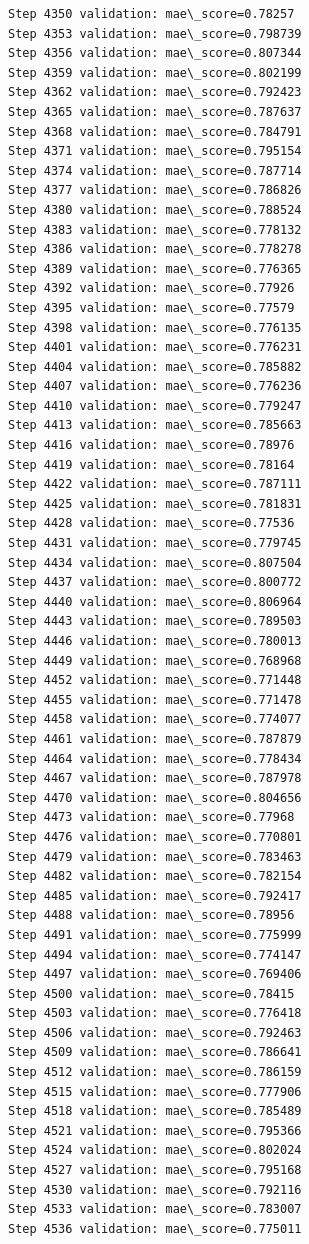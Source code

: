 \documentclass[11pt]{article}
\begin{document}
\begin{Verbatim}[commandchars=\\\{\}]
Step 4350 validation: mae\_score=0.78257
Step 4353 validation: mae\_score=0.798739
Step 4356 validation: mae\_score=0.807344
Step 4359 validation: mae\_score=0.802199
Step 4362 validation: mae\_score=0.792423
Step 4365 validation: mae\_score=0.787637
Step 4368 validation: mae\_score=0.784791
Step 4371 validation: mae\_score=0.795154
Step 4374 validation: mae\_score=0.787714
Step 4377 validation: mae\_score=0.786826
Step 4380 validation: mae\_score=0.788524
Step 4383 validation: mae\_score=0.778132
Step 4386 validation: mae\_score=0.778278
Step 4389 validation: mae\_score=0.776365
Step 4392 validation: mae\_score=0.77926
Step 4395 validation: mae\_score=0.77579
Step 4398 validation: mae\_score=0.776135
Step 4401 validation: mae\_score=0.776231
Step 4404 validation: mae\_score=0.785882
Step 4407 validation: mae\_score=0.776236
Step 4410 validation: mae\_score=0.779247
Step 4413 validation: mae\_score=0.785663
Step 4416 validation: mae\_score=0.78976
Step 4419 validation: mae\_score=0.78164
Step 4422 validation: mae\_score=0.787111
Step 4425 validation: mae\_score=0.781831
Step 4428 validation: mae\_score=0.77536
Step 4431 validation: mae\_score=0.779745
Step 4434 validation: mae\_score=0.807504
Step 4437 validation: mae\_score=0.800772
Step 4440 validation: mae\_score=0.806964
Step 4443 validation: mae\_score=0.789503
Step 4446 validation: mae\_score=0.780013
Step 4449 validation: mae\_score=0.768968
Step 4452 validation: mae\_score=0.771448
Step 4455 validation: mae\_score=0.771478
Step 4458 validation: mae\_score=0.774077
Step 4461 validation: mae\_score=0.787879
Step 4464 validation: mae\_score=0.778434
Step 4467 validation: mae\_score=0.787978
Step 4470 validation: mae\_score=0.804656
Step 4473 validation: mae\_score=0.77968
Step 4476 validation: mae\_score=0.770801
Step 4479 validation: mae\_score=0.783463
Step 4482 validation: mae\_score=0.782154
Step 4485 validation: mae\_score=0.792417
Step 4488 validation: mae\_score=0.78956
Step 4491 validation: mae\_score=0.775999
Step 4494 validation: mae\_score=0.774147
Step 4497 validation: mae\_score=0.769406
Step 4500 validation: mae\_score=0.78415
Step 4503 validation: mae\_score=0.776418
Step 4506 validation: mae\_score=0.792463
Step 4509 validation: mae\_score=0.786641
Step 4512 validation: mae\_score=0.786159
Step 4515 validation: mae\_score=0.777906
Step 4518 validation: mae\_score=0.785489
Step 4521 validation: mae\_score=0.795366
Step 4524 validation: mae\_score=0.802024
Step 4527 validation: mae\_score=0.795168
Step 4530 validation: mae\_score=0.792116
Step 4533 validation: mae\_score=0.783007
Step 4536 validation: mae\_score=0.775011

\end{Verbatim}
\end{document}
